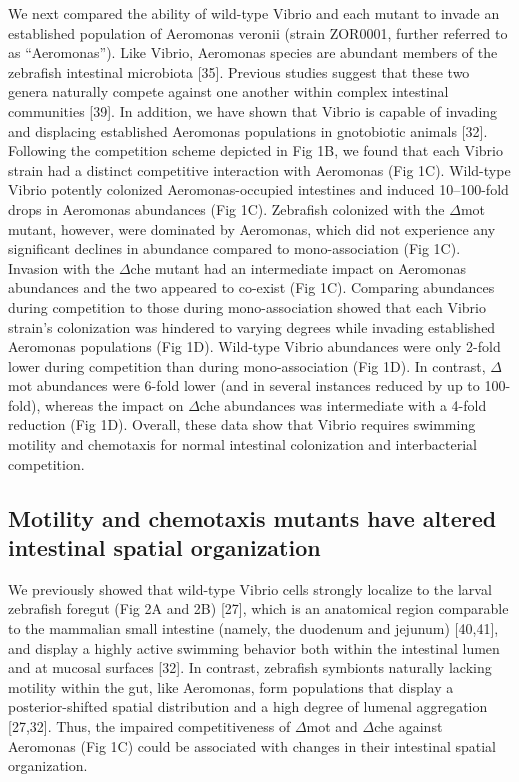 We next compared the ability of wild-type Vibrio and each mutant to invade an established population of Aeromonas veronii (strain ZOR0001, further referred to as ``Aeromonas''). Like Vibrio, Aeromonas species are abundant members of the zebrafish intestinal microbiota [35]. Previous studies suggest that these two genera naturally compete against one another within complex intestinal communities [39]. In addition, we have shown that Vibrio is capable of invading and displacing established Aeromonas populations in gnotobiotic animals [32]. Following the competition scheme depicted in Fig 1B, we found that each Vibrio strain had a distinct competitive interaction with Aeromonas (Fig 1C). Wild-type Vibrio potently colonized Aeromonas-occupied intestines and induced 10–100-fold drops in Aeromonas abundances (Fig 1C). Zebrafish colonized with the $\Delta$mot mutant, however, were dominated by Aeromonas, which did not experience any significant declines in abundance compared to mono-association (Fig 1C). Invasion with the $\Delta$che mutant had an intermediate impact on Aeromonas abundances and the two appeared to co-exist (Fig 1C). Comparing abundances during competition to those during mono-association showed that each Vibrio strain's colonization was hindered to varying degrees while invading established Aeromonas populations (Fig 1D). Wild-type Vibrio abundances were only 2-fold lower during competition than during mono-association (Fig 1D). In contrast, $\Delta$mot abundances were 6-fold lower (and in several instances reduced by up to 100-fold), whereas the impact on $\Delta$che abundances was intermediate with a 4-fold reduction (Fig 1D). Overall, these data show that Vibrio requires swimming motility and chemotaxis for normal intestinal colonization and interbacterial competition.


\subsection{Motility and chemotaxis mutants have altered intestinal spatial organization}
We previously showed that wild-type Vibrio cells strongly localize to the larval zebrafish foregut (Fig 2A and 2B) [27], which is an anatomical region comparable to the mammalian small intestine (namely, the duodenum and jejunum) [40,41], and display a highly active swimming behavior both within the intestinal lumen and at mucosal surfaces [32]. In contrast, zebrafish symbionts naturally lacking motility within the gut, like Aeromonas, form populations that display a posterior-shifted spatial distribution and a high degree of lumenal aggregation [27,32]. Thus, the impaired competitiveness of $\Delta$mot and $\Delta$che against Aeromonas (Fig 1C) could be associated with changes in their intestinal spatial organization. 

